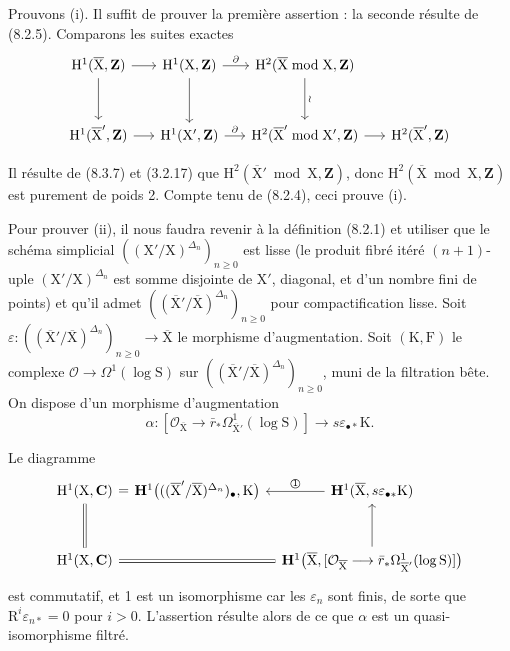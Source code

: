 \documentclass[11pt,leqno]{article}
\begin{document}
Prouvons (i). Il suffit de prouver la première assertion : la seconde résulte de (8.2.5). Comparons les suites exactes
\[
\begin{tikzcd}[column sep=1.5em,row sep=3em]
\mathrm{H}^{1}(\overline{\mathrm{X}},\mathbf{Z})
 \arrow[r] \arrow[d]
&
\mathrm{H}^{1}(\mathrm{X},\mathbf{Z})
 \arrow[r,"\partial"] \arrow[d]
&
\mathrm{H}^{2}(\overline{\mathrm{X}}\bmod\mathrm{X},\mathbf{Z})
 \arrow[d,"\wr"]
&
\\
\mathrm{H}^{1}(\overline{\mathrm{X}}',\mathbf{Z})
 \arrow[r]
&
\mathrm{H}^{1}(\mathrm{X}',\mathbf{Z})
 \arrow[r,"\partial"]
&
\mathrm{H}^{2}(\overline{\mathrm{X}}'\bmod\mathrm{X}',\mathbf{Z})
 \arrow[r]
&
\mathrm{H}^{2}(\overline{\mathrm{X}}',\mathbf{Z})
\end{tikzcd}
\]

Il résulte de (8.3.7) et (3.2.17) que \(\mathrm{H}^{2}(\overline{\mathrm{X}}'\bmod\mathrm{X},\mathbf{Z})\), donc \(\mathrm{H}^{2}(\overline{\mathrm{X}}\bmod\mathrm{X},\mathbf{Z})\) est purement de poids 2. Compte tenu de (8.2.4), ceci prouve (i).

Pour prouver (ii), il nous faudra revenir à la définition (8.2.1) et utiliser que le schéma simplicial \(((\mathrm{X}'/\mathrm{X})^{\Delta_n})_{n\geq0}\) est lisse (le produit fibré itéré \((n+1)\)-uple \((\mathrm{X}'/\mathrm{X})^{\Delta_n}\) est somme disjointe de \(\mathrm{X}'\), diagonal, et d’un nombre fini de points) et qu’il admet \(((\overline{\mathrm{X}}'/\overline{\mathrm{X}})^{\Delta_n})_{n\geq0}\) pour compactification lisse. Soit \(\varepsilon:((\overline{\mathrm{X}}'/\overline{\mathrm{X}})^{\Delta_n})_{n\geq0}\to\overline{\mathrm{X}}\) le morphisme d’augmentation. Soit \((\mathrm{K},\mathrm{F})\) le complexe \(\mathcal{O}\to\Omega^{1}(\log\mathrm{S})\) sur \(((\overline{\mathrm{X}}'/\overline{\mathrm{X}})^{\Delta_n})_{n\geq0}\), muni de la filtration bête. On dispose d’un morphisme d’augmentation
\[
\alpha:
[\mathcal{O}_{\overline{\mathrm{X}}}\to
 \bar r_*\Omega^{1}_{\overline{\mathrm{X}}'}(\log\mathrm{S})]
\longrightarrow s\varepsilon_{\bullet *}\mathrm{K}.
\]

Le diagramme
\[
\begin{tikzcd}[column sep=0.7em,row sep=3em]
\mathrm{H}^{1}(\mathrm{X},\mathbf{C})
 \arrow[r,phantom,"{\textstyle=}" description]
 \arrow[d,equal]
&
\mathbf{H}^{1}\bigl(
 ((\overline{\mathrm{X}}'/\overline{\mathrm{X}})^{\Delta_n})_{\bullet},
 \mathrm{K}\bigr)
&
\mathbf{H}^{1}(\overline{\mathrm{X}},s\varepsilon_{\bullet *}\mathrm{K})
 \arrow[l,"\text{\textcircled{1}}"']
\\
\mathrm{H}^{1}(\mathrm{X},\mathbf{C}) \arrow[rr,equal]
&&
\mathbf{H}^{1}\bigl(\overline{\mathrm{X}},
 [\mathcal{O}_{\overline{\mathrm{X}}}\longrightarrow
 \bar r_*\Omega^{1}_{\overline{\mathrm{X}}'}(\log\mathrm{S})]\bigr)
 \arrow[u]
\end{tikzcd}
\]
est commutatif, et 1 est un isomorphisme car les \(\varepsilon_n\) sont finis, de sorte que \(\mathrm{R}^{i}\varepsilon_{n*}=0\) pour \(i>0\). L’assertion résulte alors de ce que \(\alpha\) est un quasi-isomorphisme filtré.
\end{document}
